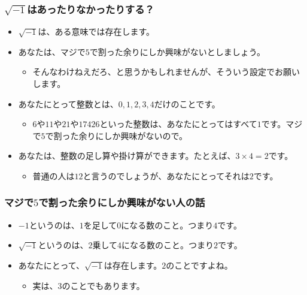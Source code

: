 \documentclass[dvipdfmx]{beamer}
\begin{document}
  \begin{frame}
    \frametitle{$\sqrt{-1}$はあったりなかったりする？}
  
    \begin{itemize}
      \item $\sqrt{-1}$は、ある意味では存在します。
      \item あなたは、マジで$5$で割った余りにしか興味がないとしましょう。
      \begin{itemize}
        \item そんなわけねえだろ、と思うかもしれませんが、そういう設定でお願いします。
      \end{itemize}
      \item あなたにとって整数とは、$0, 1, 2, 3, 4$だけのことです。
      \begin{itemize}
        \item $6$や$11$や$21$や$17426$といった整数は、あなたにとってはすべて$1$です。マジで$5$で割った余りにしか興味がないので。
      \end{itemize}
      \item あなたは、整数の足し算や掛け算ができます。たとえば、$3 \times 4 = 2$です。
      \begin{itemize}
        \item 普通の人は$12$と言うのでしょうが、あなたにとってそれは$2$です。
      \end{itemize}
    \end{itemize}
  
  \end{frame}

  \begin{frame}
    \frametitle{マジで$5$で割った余りにしか興味がない人の話}
  
    \begin{itemize}
      \item $-1$というのは、$1$を足して$0$になる数のこと。つまり$4$です。
      \item $\sqrt{-1}$というのは、$2$乗して$4$になる数のこと。つまり$2$です。
      \item あなたにとって、$\sqrt{-1}$は存在します。$2$のことですよね。
      \begin{itemize}
        \item 実は、$3$のことでもあります。
      \end{itemize}
    \end{itemize}
  
  \end{frame}
\end{document}
